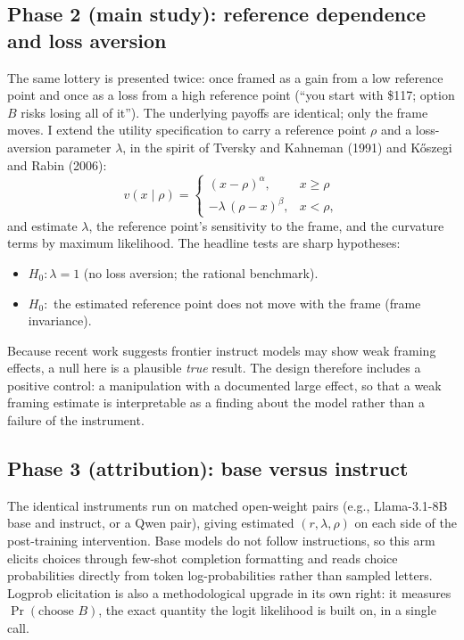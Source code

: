 \documentclass[11pt]{article}
\begin{document}
\subsection{Phase 2 (main study): reference dependence and loss aversion}
The same lottery is presented twice: once framed as a gain from a low reference point and once as a
loss from a high reference point (``you start with \$117; option $B$ risks losing all of it''). The
underlying payoffs are identical; only the frame moves. I extend the utility specification to carry a
reference point $\rho$ and a loss-aversion parameter $\lambda$, in the spirit of Tversky and Kahneman
(1991) and K\H{o}szegi and Rabin (2006):
\[
  v(x \mid \rho) =
  \begin{cases}
    (x - \rho)^{\alpha}, & x \ge \rho \\[4pt]
    -\lambda\,(\rho - x)^{\beta}, & x < \rho,
  \end{cases}
\]
and estimate $\lambda$, the reference point's sensitivity to the frame, and the curvature terms by
maximum likelihood. The headline tests are sharp hypotheses:
\begin{itemize}
  \item $H_0: \lambda = 1$ (no loss aversion; the rational benchmark).
  \item $H_0:$ the estimated reference point does not move with the frame (frame invariance).
\end{itemize}
Because recent work suggests frontier instruct models may show weak framing effects, a null here is a
plausible \emph{true} result. The design therefore includes a positive control: a manipulation with a
documented large effect, so that a weak framing estimate is interpretable as a finding about the model
rather than a failure of the instrument.

\subsection{Phase 3 (attribution): base versus instruct}
The identical instruments run on matched open-weight pairs (e.g., Llama-3.1-8B base and instruct, or a
Qwen pair), giving estimated $(r, \lambda, \rho)$ on each side of the post-training intervention.
Base models do not follow instructions, so this arm elicits choices through few-shot completion
formatting and reads choice probabilities directly from token log-probabilities rather than sampled
letters. Logprob elicitation is also a methodological upgrade in its own right: it measures
$\Pr(\text{choose } B)$, the exact quantity the logit likelihood is built on, in a single call.
\end{document}
